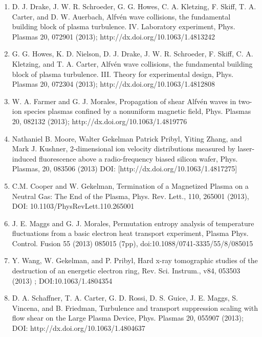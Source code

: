 \documentclass[11pt]{article}
\begin{document}
\begin{enumerate}
\item  D. J. Drake, J. W. R. Schroeder, G. G. Howes, C. A. Kletzing, F. Skiff, T. A. Carter, and D. W. Auerbach, Alfv\'{e}n wave collisions, the fundamental building block of plasma turbulence. IV. Laboratory experiment, Phys. Plasmas 20, 072901 (2013); http://dx.doi.org/10.1063/1.4813242

\item  G. G. Howes, K. D. Nielson, D. J. Drake, J. W. R. Schroeder, F. Skiff, C. A. Kletzing, and T. A. Carter, Alfv\'{e}n wave collisions, the fundamental building block of plasma turbulence. III. Theory for experimental design, Phys. Plasmas 20, 072304 (2013); http://dx.doi.org/10.1063/1.4812808

\item  W. A. Farmer and G. J. Morales, Propagation of shear Alfv\'{e}n waves in two-ion species plasmas confined by a nonuniform magnetic field, Phys. Plasmas 20, 082132 (2013); http://dx.doi.org/10.1063/1.4819776

\item   Nathaniel B. Moore, Walter Gekelman Patrick Pribyl, Yiting Zhang, and Mark J. Kushner, 2-dimensional ion velocity distributions measured by laser-induced fluorescence above a radio-frequency biased silicon wafer, Phys. Plasmas, 20, 083506 (2013) DOI: [http://dx.doi.org/10.1063/1.4817275]

\item  C.M. Cooper and W. Gekelman, Termination of a Magnetized Plasma on a Neutral Gas: The End of the Plasma, Phys. Rev. Lett., 110, 265001 (2013), DOI: 10.1103/PhysRevLett.110.265001

\item   J. E. Maggs and G. J. Morales, Permutation entropy analysis of temperature fluctuations from a basic electron heat transport experiment, Plasma Phys. Control. Fusion 55 (2013) 085015 (7pp), doi:10.1088/0741-3335/55/8/085015

\item  Y. Wang, W. Gekelman, and P. Pribyl, Hard x-ray tomographic studies of the destruction of an energetic electron ring, Rev. Sci. Instrum., v84, 053503 (2013) ; DOI:10.1063/1.4804354

\item   D. A. Schaffner, T. A. Carter, G. D. Rossi, D. S. Guice, J. E. Maggs, S. Vincena, and B. Friedman, Turbulence and transport suppression scaling with flow shear on the Large Plasma Device, Phys. Plasmas 20, 055907 (2013); DOI: http://dx.doi.org/10.1063/1.4804637


\end{enumerate}
\end{document}
